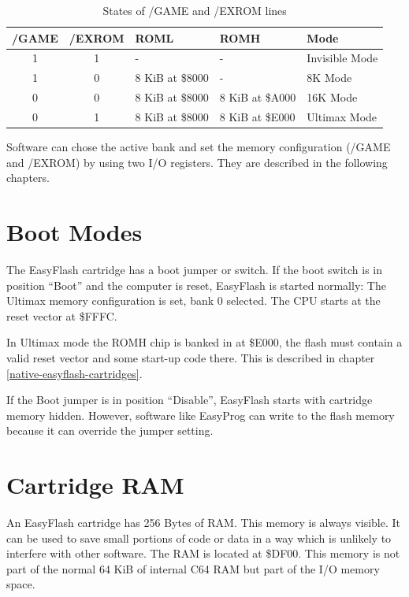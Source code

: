 \documentclass[a4paper,oneside]{memoir}
\begin{document}
\begin{table}[!htbp]
    \centering
    \begin{tabularx}{\textwidth}{ccllX}
        \toprule
        /GAME & /EXROM & ROML & ROMH & Mode \\
        \midrule
        1 & 1 &     -               & -                 & Invisible Mode \\[3pt]
        1 & 0 &     8 KiB at \$8000 & -                 & 8K Mode  \\[3pt]
        0 & 0 &     8 KiB at \$8000 & 8 KiB at \$A000   & 16K Mode \\[3pt]
        0 & 1 &     8 KiB at \$8000 & 8 KiB at \$E000   & Ultimax Mode \\[3pt]
        \bottomrule
    \end{tabularx}
    \caption{States of /GAME and /EXROM lines}
    \label{tab:game-exrom}
\end{table}

Software can chose the active bank and set the memory configuration (/GAME and /EXROM) by using two I/O registers.
They are described in the following chapters.

\section{Boot Modes}
The EasyFlash cartridge has a boot jumper or switch. If the boot switch is in position “Boot” and the computer is reset, EasyFlash is started normally: The Ultimax memory configuration is set, bank 0 selected. The CPU starts at
the reset vector at \$FFFC.

In Ultimax mode the ROMH chip is banked in at \$E000, the flash must contain a valid reset vector and some start-up code there. This is described in chapter \ref{native-easyflash-cartridges}.

If the Boot jumper is in position “Disable”, EasyFlash starts with cartridge memory hidden. However, software like EasyProg can write to the flash memory because it can override the jumper setting.

\section{Cartridge RAM}
An EasyFlash cartridge has 256 Bytes of RAM. This memory is always visible. It can be used to save small portions of code or data in a way which is unlikely to interfere with other
software. The RAM is located at \$DF00. This memory is not part of the normal 64 KiB of internal C64 RAM but part of the I/O memory space.
\end{document}
